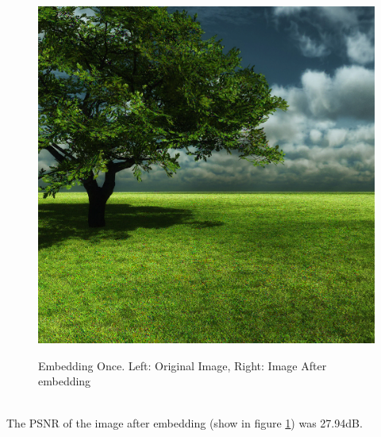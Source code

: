\documentclass[12pt]{article}
\begin{document}
\begin{figure}[h]
{\includegraphics[scale=0.45]{"Tree Embed once 0.8 threshold/finalImage"}%
}%
\caption{Embedding Once. Left: Original Image, Right: Image After embedding}
\label{fig:treeEmbedOnceEmbedding}
\end{figure}

\hspace{0pt} \\
The PSNR of the image after embedding (show in figure \ref{fig:treeEmbedOnceEmbedding}) was 27.94dB.
\end{document}
